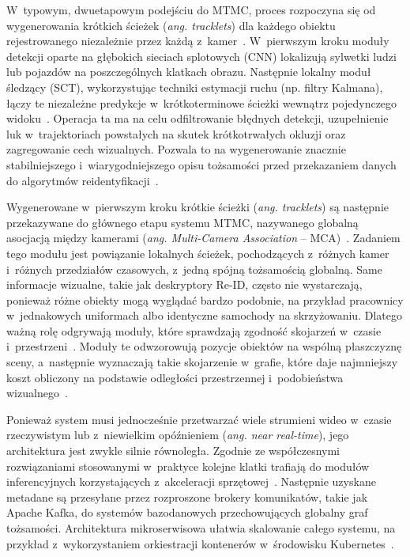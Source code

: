 W~typowym, dwuetapowym podejściu do MTMC, proces rozpoczyna się od wygenerowania krótkich ścieżek
(\textit{ang. tracklets}) dla każdego obiektu rejestrowanego niezależnie przez każdą
z~kamer~\cite{woo2024, ristani2016}. W~pierwszym kroku moduły detekcji oparte na głębokich sieciach
splotowych (CNN) lokalizują sylwetki ludzi lub pojazdów na poszczególnych klatkach obrazu.
Następnie lokalny moduł śledzący (SCT), wykorzystując techniki estymacji ruchu (np. filtry
Kalmana), łączy te niezależne predykcje w~krótkoterminowe ścieżki wewnątrz pojedynczego
widoku~\cite{bewley2016, aharon2022}. Operacja ta ma na celu odfiltrowanie błędnych detekcji,
uzupełnienie luk w~trajektoriach powstałych na skutek krótkotrwałych okluzji oraz zagregowanie cech
wizualnych. Pozwala to na wygenerowanie znacznie stabilniejszego i~wiarygodniejszego opisu
tożsamości przed przekazaniem danych do algorytmów reidentyfikacji~\cite{ristani2016, riu2024}.

Wygenerowane w~pierwszym kroku krótkie ścieżki (\textit{ang. tracklets}) są następnie przekazywane
do głównego etapu systemu MTMC, nazywanego globalną asocjacją między kamerami (\textit{ang.
  Multi-Camera Association} -- MCA)~\cite{woo2024}. Zadaniem tego modułu jest powiązanie lokalnych
ścieżek, pochodzących z~różnych kamer i~różnych przedziałów czasowych, z~jedną spójną tożsamością
globalną. Same informacje wizualne, takie jak deskryptory Re-ID, często nie wystarczają, ponieważ
różne obiekty mogą wyglądać bardzo podobnie, na przykład pracownicy w~jednakowych uniformach albo
identyczne samochody na skrzyżowaniu. Dlatego ważną rolę odgrywają moduły, które sprawdzają
zgodność skojarzeń w~czasie i~przestrzeni~\cite{riu2024}. Moduły te odwzorowują pozycje obiektów na
wspólną płaszczyznę sceny, a~następnie wyznaczają takie skojarzenie w~grafie, które daje
najmniejszy koszt obliczony na podstawie odległości przestrzennej i~podobieństwa
wizualnego~\cite{ristani2016, riu2024}.

Ponieważ system musi jednocześnie przetwarzać wiele strumieni wideo w~czasie rzeczywistym lub
z~niewielkim opóźnieniem (\textit{ang. near real-time}), jego architektura jest zwykle silnie
równoległa. Zgodnie ze współczesnymi rozwiązaniami stosowanymi w~praktyce kolejne klatki trafiają
do modułów inferencyjnych korzystających z~akceleracji sprzętowej~\cite{nvidia_mtmc}. Następnie
uzyskane metadane są przesyłane przez rozproszone brokery komunikatów, takie jak Apache Kafka, do
systemów bazodanowych przechowujących globalny graf tożsamości. Architektura mikroserwisowa ułatwia
skalowanie całego systemu, na przykład z~wykorzystaniem orkiestracji kontenerów w~środowisku
Kubernetes~\cite{nvidia_mtmc}.

